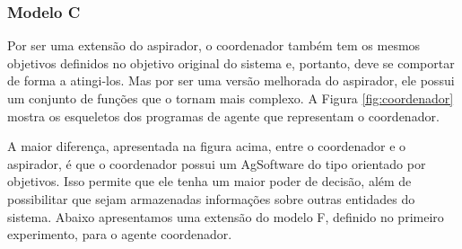 \subsubsection{Modelo C}

Por ser uma extensão do aspirador, o coordenador também tem os mesmos objetivos definidos no objetivo original do sistema e, portanto, deve se comportar de forma a atingi-los. Mas por ser uma versão melhorada do aspirador, ele possui um conjunto de funções que o tornam mais complexo. A Figura \ref{fig:coordenador} mostra os esqueletos dos programas de agente que representam o coordenador. 

\begin{figure}[h!]
    \centering
\end{figure}

A maior diferença, apresentada na figura acima, entre o coordenador e o aspirador, é que o coordenador possui um AgSoftware do tipo orientado por objetivos. Isso permite que ele tenha um maior poder de decisão, além de possibilitar que sejam armazenadas informações sobre outras entidades do sistema. Abaixo apresentamos uma extensão do modelo F, definido no primeiro experimento, para o agente coordenador.

